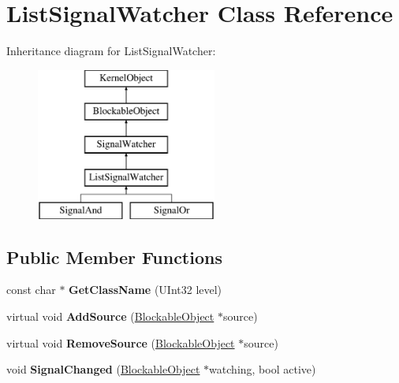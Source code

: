 \hypertarget{class_list_signal_watcher}{}\section{List\+Signal\+Watcher Class Reference}
\label{class_list_signal_watcher}
Inheritance diagram for List\+Signal\+Watcher\+:\begin{figure}[H]
\begin{center}
\leavevmode
\includegraphics[height=5.000000cm]{class_list_signal_watcher}
\end{center}
\end{figure}
\subsection*{Public Member Functions}
\begin{DoxyCompactItemize}
\item 
\mbox{\label{class_list_signal_watcher_a9ac6c93c03804ba56a8336b6f0b0bead}} 
const char $\ast$ {\bfseries Get\+Class\+Name} (U\+Int32 level)
\item 
\mbox{\label{class_list_signal_watcher_a5d3d589777d5508c59b4bc36eb0c291b}} 
virtual void {\bfseries Add\+Source} (\hyperlink{class_blockable_object}{Blockable\+Object} $\ast$source)
\item 
\mbox{\label{class_list_signal_watcher_a15977566c74ce095722abfd8e1c62c9d}} 
virtual void {\bfseries Remove\+Source} (\hyperlink{class_blockable_object}{Blockable\+Object} $\ast$source)
\item 
\mbox{\label{class_list_signal_watcher_a279fd18750f1f0be3a19b1327c0c00ca}} 
void {\bfseries Signal\+Changed} (\hyperlink{class_blockable_object}{Blockable\+Object} $\ast$watching, bool active)
\end{DoxyCompactItemize}
